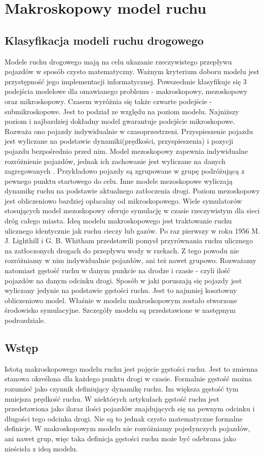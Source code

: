 \documentclass[12pt]{book}
\begin{document}
\chapter{Makroskopowy model ruchu}
\section{Klasyfikacja modeli ruchu drogowego}
Modele ruchu drogowego mają na celu ukazanie rzeczywistego przepływu pojazdów w sposób czysto matematyczny. Ważnym kryterium doboru modelu jest przystępność jego implementacji informatycznej. Powszechnie klasyfikuje się 3 podejścia modelowe dla omawianego problemu \cite{CompareModels} - makroskopowy, mezoskopowy oraz mikroskopowy. Czasem \cite{multilevel} wyróżnia się także czwarte podejście - submikroskopowe. Jest to podział ze względu na poziom modelu. Najniższy poziom i najbardziej dokładny model gwarantuje podejście mikroskopowe. Rozważa ono pojazdy indywidualnie w czasoprzestrzeni. Przyspieszenie pojazdu jest wyliczane na podstawie dynamiki(prędkości, przyspieszenia) i pozycji pojazdu bezpośrednio przed nim. Model mezoskopowy zapewnia indywidualne rozróżnienie pojazdów, jednak ich zachowanie jest wyliczane na danych zagregowanych \cite{mesoscopic}. Przykładowo pojazdy są zgrupowane w grupę podróżującą z pewnego punktu startowego do celu. Inne modele \cite{mesoscopic2} mezoskopowe wyliczają dynamikę ruchu na podstawie aktualnego zatłoczenia drogi. Poziom mezoskopowy jest obliczeniowo bardziej opłacalny od mikroskopowego.
Wiele symulatorów stosujących model mezoskopowy oferuje symulację w czasie rzeczywistym dla sieci dróg całego miasta\cite{vu2017high}. Ideą modelu makroskopowego jest traktowanie ruchu ulicznego identycznie jak ruchu cieczy lub gazów. Po raz pierwszy w roku 1956 M. J. Lighthill i G. B. Whitham \cite{lwr} przedstawili pomysł przyrównania ruchu ulicznego na zatłoczonych drogach do przepływu wody w rzekach. Z tego powodu nie rozróżniamy w nim indywidualnie pojazdów, ani też nawet grupowo. Rozważamy natomiast gęstość ruchu w danym punkcie na drodze i czasie - czyli ilość pojazdów na danym odcinku drogi. Sposób w jaki poruszają się pojazdy jest wyliczany jedynie na podstawie gęstości ruchu. Jest to najmniej kosztowny obliczeniowo model. Właśnie w modelu makroskopowym zostało stworzone środowisko symulacyjne. Szczegóły modelu są przedstawione w następnym podrozdziale.

\section{Wstęp}
Istotą makroskopowego modelu ruchu jest pojęcie gęstości ruchu. Jest to zmienna stanowa określona dla każdego punktu drogi w czasie. Formalnie gęstość można rozumieć jako czynnik definiujący dynamikę ruchu. Im większa gęstość tym mniejsza prędkość ruchu. W niektórych artykułach gęstość ruchu \cite{helbing2001master} jest przedstawiona jako iloraz ilości pojazdów znajdujących się na pewnym odcinku i długości tego odcinka drogi. Nie są to jednak czysto matematyczne formalne definicje. W makroskopowym modelu nie rozróżniamy pojedynczych pojazdów, ani nawet grup, więc taka definicja gęstości ruchu może być odebrana jako nieścisła z ideą modelu. 
\end{document}
